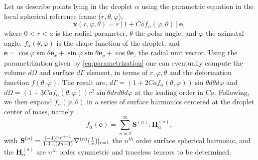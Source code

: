 Let us describe points lying in the droplet $\alpha$ using the parametric equation in the local spherical reference frame ($r,\theta,\varphi$),
\begin{equation}
    \textbf{x}(r,\varphi,\theta) = r [1+ Ca f_\alpha(\varphi,\theta)] \textbf{e},
    \label{eq:parametrization}
\end{equation}
where $0<r<a$ is the radial parameter, $\theta$ the polar angle, and $\varphi$ the azimutal angle. 
$f_\alpha(\theta,\varphi)$ is the shape function of the droplet, and $\textbf{e} = \cos\varphi\sin\theta \textbf{e}_x + \sin\varphi\sin\theta\textbf{e}_y+ \cos\theta \textbf{e}_z$ the radial unit vector. 
Using the parametrization given by \ref{eq:parametrization} one can eventually compute the volume $d\Omega$ and surface $d\Gamma$ element, in terms of $r,\varphi,\theta$ and the deformation function $f(\theta,\varphi)$.
The result are, $d\Gamma = (1+2Ca f_\alpha(\theta,\varphi)) \sin\theta d\theta d\varphi$ and $d\Omega = (1+3Ca f_\alpha(\theta,\varphi)) r^2\sin\theta drd\theta d\varphi$ at the leading order in $Ca$. 
Following, \citet{nadim1996concise,nadim1991motion} we then expand $f_\alpha(\varphi,\theta)$ in a series of surface harmonics centered at the droplet center of mass, namely 
\begin{equation}
    f_\alpha(\textbf{e}) = 
    \sum_{n=2}^\infty\textbf{S}^{(n)}:\textbf{H}_\alpha^{(n)},
    \label{eq:f_definition}
\end{equation} 
with $\textbf{S}^{(n)} = \frac{(-1)^n r^{n+1}}{1\cdot3\ldots(2n-1)}\mathbf{\nabla}^{(n)}(\frac{1}{r})|_{r=1}$ the $n^{th}$ order surface spherical harmonic, and the $\textbf{H}_\alpha^{(n)}$ are $n^{th}$ order symmetric and traceless tensors to be determined. 

